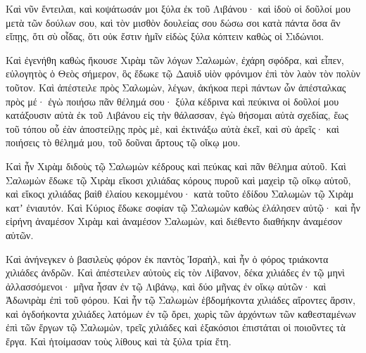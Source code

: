 {Καὶ νῦν ἔντειλαι, καὶ κοψάτωσάν μοι ξύλα ἐκ τοῦ Λιβάνου· καὶ ἰδοὺ οἱ δοῦλοί μου μετὰ τῶν δούλων σου, καὶ τὸν μισθὸν δουλείας σου δώσω σοι κατὰ πάντα ὅσα ἂν εἴπῃς, ὅτι σὺ οἶδας, ὅτι οὐκ ἔστιν ἡμῖν εἰδὼς ξύλα κόπτειν καθὼς οἱ Σιδώνιοι.
\par }{\PP {}Καὶ ἐγενήθη καθὼς ἤκουσε Χιρὰμ τῶν λόγων Σαλωμὼν, ἐχάρη σφόδρα, καὶ εἶπεν, εὐλογητὸς ὁ Θεὸς σήμερον, ὃς ἔδωκε τῷ Δαυὶδ υἱὸν φρόνιμον ἐπὶ τὸν λαὸν τὸν πολὺν τοῦτον.
Καὶ ἀπέστειλε πρὸς Σαλωμὼν, λέγων, ἀκήκοα περὶ πάντων ὧν ἀπέσταλκας πρὸς μέ· ἐγὼ ποιήσω πᾶν θέλημά σου· ξύλα κέδρινα καὶ πεύκινα
οἱ δοῦλοί μου κατάξουσιν αὐτὰ ἐκ τοῦ Λιβάνου εἰς τὴν θάλασσαν, ἐγὼ θήσομαι αὐτὰ σχεδίας, ἕως τοῦ τόπου οὗ ἐὰν ἀποστείλῃς πρὸς μὲ, καὶ ἐκτινάξω αὐτὰ ἐκεῖ, καὶ σὺ ἀρεῖς· καὶ ποιήσεις τὸ θέλημά μου, τοῦ δοῦναι ἄρτους τῷ οἴκῳ μου.
\par }{\PP {}Καὶ ἦν Χιρὰμ διδοὺς τῷ Σαλωμὼν κέδρους καὶ πεύκας καὶ πᾶν θέλημα αὐτοῦ.
Καὶ Σαλωμὼν ἔδωκε τῷ Χιρὰμ εἴκοσι χιλιάδας κόρους πυροῦ καὶ μαχεὶρ τῷ οἴκῳ αὐτοῦ, καὶ εἴκοςι χιλιάδας βαὶθ ἐλαίου κεκομμένου· κατὰ τοῦτο ἐδίδου Σαλωμὼν τῷ Χιρὰμ κατʼ ἐνιαυτόν.
Καὶ Κύριος ἔδωκε σοφίαν τῷ Σαλωμὼν καθὼς ἐλάλησεν αὐτῷ· καὶ ἦν εἰρήνη ἀναμέσον Χιρὰμ καὶ ἀναμέσον Σαλωμὼν, καὶ διέθεντο διαθήκην ἀναμέσον αὐτῶν.
\par }{\PP {}Καὶ ἀνήνεγκεν ὁ βασιλεὺς φόρον ἐκ παντὸς Ἰσραὴλ, καὶ ἦν ὁ φόρος τριάκοντα χιλιάδες ἀνδρῶν.
Καὶ ἀπέστειλεν αὐτοὺς εἰς τὸν Λίβανον, δέκα χιλιάδες ἐν τῷ μηνὶ ἀλλασσόμενοι· μῆνα ἦσαν ἐν τῷ Λιβάνῳ, καὶ δύο μῆνας ἐν οἴκῳ αὐτῶν· καὶ Ἀδωνιρὰμ ἐπὶ τοῦ φόρου.
Καὶ ἦν τῷ Σαλωμὼν ἑβδομήκοντα χιλιάδες αἴροντες ἄρσιν, καὶ ὀγδοήκοντα χιλιάδες λατόμων ἐν τῷ ὄρει,
χωρὶς τῶν ἀρχόντων τῶν καθεσταμένων ἐπὶ τῶν ἔργων τῷ Σαλωμὼν, τρεῖς χιλιάδες καὶ ἑξακόσιοι ἐπιστάται οἱ ποιοῦντες τὰ ἔργα.
Καὶ ἡτοίμασαν τοὺς λίθους καὶ τὰ ξύλα τρία ἔτη.

}
